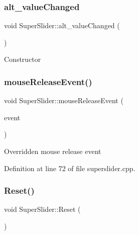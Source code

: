\mbox{\label{class_super_slider_ad061aa26ff1184c5d2483b39df5e4744}} 
\subsubsection{\texorpdfstring{alt\+\_\+value\+Changed}{alt\_valueChanged}}
{\footnotesize\ttfamily void Super\+Slider\+::alt\+\_\+value\+Changed (\begin{DoxyParamCaption}\item[{int}]{ }\end{DoxyParamCaption})\hspace{0.3cm}{\ttfamily [signal]}}

Constructor \mbox{\label{class_super_slider_ac008206439cf573a9947626c916559d5}} 
\subsubsection{\texorpdfstring{mouse\+Release\+Event()}{mouseReleaseEvent()}}
{\footnotesize\ttfamily void Super\+Slider\+::mouse\+Release\+Event (\begin{DoxyParamCaption}\item[{Q\+Mouse\+Event $\ast$}]{event }\end{DoxyParamCaption})}

Overridden mouse release event 

Definition at line 72 of file superslider.\+cpp.

\mbox{\label{class_super_slider_aee1cced49be3361b1d2262cbcd49fb77}} 
\subsubsection{\texorpdfstring{Reset()}{Reset()}}
{\footnotesize\ttfamily void Super\+Slider\+::\+Reset (\begin{DoxyParamCaption}{ }\end{DoxyParamCaption})}

